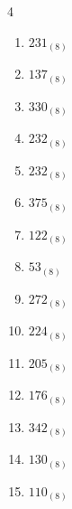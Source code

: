 \begin{multicols}{4}
\begin{enumerate}
  \item $231_{(8)}$

        \phantom{$=153$}

  \item $137_{(8)}$

        \phantom{$=95$}

  \item $330_{(8)}$

        \phantom{$=216$}

  \item $232_{(8)}$

        \phantom{$=154$}

  \item $232_{(8)}$

        \phantom{$=154$}

  \item $375_{(8)}$

        \phantom{$=253$}

  \item $122_{(8)}$

        \phantom{$=82$}

  \item $53_{(8)}$

        \phantom{$=43$}

  \item $272_{(8)}$

        \phantom{$=186$}

  \item $224_{(8)}$

        \phantom{$=148$}

\columnbreak %

\resetques

  \item $205_{(8)}$

        \phantom{$=133$}

  \item $176_{(8)}$

        \phantom{$=126$}

  \item $342_{(8)}$

        \phantom{$=226$}

  \item $130_{(8)}$

        \phantom{$=88$}

  \item $110_{(8)}$

        \phantom{$=72$}


\end{enumerate}
\end{multicols}
